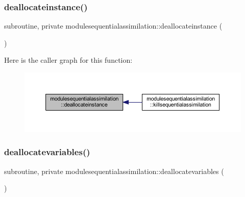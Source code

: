 \subsubsection{\texorpdfstring{deallocateinstance()}{deallocateinstance()}}
{\footnotesize\ttfamily subroutine, private modulesequentialassimilation\+::deallocateinstance (\begin{DoxyParamCaption}{ }\end{DoxyParamCaption})\hspace{0.3cm}{\ttfamily [private]}}

Here is the caller graph for this function\+:\nopagebreak
\begin{figure}[H]
\begin{center}
\leavevmode
\includegraphics[width=350pt]{namespacemodulesequentialassimilation_a3d80f83cfeb707312981be037f194082_icgraph}
\end{center}
\end{figure}
\mbox{\label{namespacemodulesequentialassimilation_aa604c23d9d9ee0bb814f499c565fde3f}} 
\subsubsection{\texorpdfstring{deallocatevariables()}{deallocatevariables()}}
{\footnotesize\ttfamily subroutine, private modulesequentialassimilation\+::deallocatevariables (\begin{DoxyParamCaption}{ }\end{DoxyParamCaption})\hspace{0.3cm}{\ttfamily [private]}}

